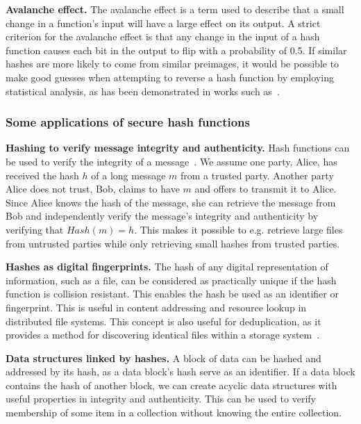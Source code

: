 \noindent
{\bf Avalanche effect.}
The avalanche effect is a term used to describe that a small change in a function's input will have a large effect on its output. A strict criterion for the avalanche effect is that any change in the input of a hash function causes each bit in the output to flip with a probability of 0.5. If similar hashes are more likely to come from similar preimages, it would be possible to make good guesses when attempting to reverse a hash function by employing statistical analysis, as has been demonstrated in works such as~\cite{wang_cryptanalysis_2005}.

\subsubsection{Some applications of secure hash functions}

\noindent
{\bf Hashing to verify message integrity and authenticity.}
Hash functions can be used to verify the integrity of a message~\cite[p.~158--164]{lindell2014introduction}. We assume one party, Alice, has received the hash $h$ of a long message $m$ from a trusted party. Another party Alice does not trust, Bob, claims to have $m$ and offers to transmit it to Alice. Since Alice knows the hash of the message, she can retrieve the message from Bob and independently verify the message's integrity and authenticity by verifying that $Hash(m) = h$. This makes it possible to e.g. retrieve large files from untrusted parties while only retrieving small hashes from trusted parties.

\noindent
{\bf Hashes as digital fingerprints.}
The hash of any digital representation of information, such as a file, can be considered as practically unique if the hash function is collision resistant. This enables the hash be used as an identifier or fingerprint. This is useful in content addressing and resource lookup in distributed file systems. This concept is also useful for deduplication, as it provides a method for discovering identical files within a storage system~\cite[p.~182-183]{lindell2014introduction}. 

\noindent
{\bf Data structures linked by hashes.}
A block of data can be hashed and addressed by its hash, as a data block's hash serve as an identifier. If a data block contains the hash of another block, we can create acyclic data structures with useful properties in integrity and authenticity. This can be used to verify membership of some item in a collection without knowing the entire collection.

